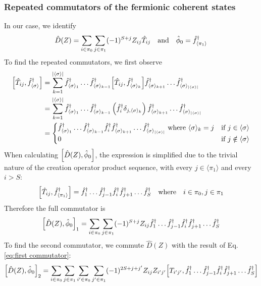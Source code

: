 \documentclass[12pt]{article}
\newcommand{\seq}[1]{\langle #1\rangle}
\newcommand{\hc}{^\dagger}
\begin{document}
	\subsubsection{Repeated commutators of the fermionic coherent states}
	In our case, we identify
	\begin{equation}
	\hat{D}(Z)=\sum_{i\in\pi_0}\sum_{j\in\pi_1}(-1)^{S+j}Z_{ij}\hat{T}_{ij}\qq{and}\hat{\phi}_0=\hat{f}\hc_{\seq{\pi_1}}
	\end{equation}
	To find the repeated commutators, we first observe
	\begin{align}
	\comm{\hat{T}_{ij}}{\hat{f}\hc_{\seq{\sigma}}}&=\sum_{k=1}^{\abs{\seq{\sigma}}}\hat{f}\hc_{\seq{\sigma}_1}\dots \hat{f}\hc_{\seq{\sigma}_{k-1}}\comm{\hat{T}_{ij}}{\hat{f}\hc_{\seq{\sigma}_k}}\hat{f}\hc_{\seq{\sigma}_{k+1}}\dots \hat{f}\hc_{\seq{\sigma}_\abs{\seq{\sigma}}}\nonumber\\
	&= \sum_{k=1}^{\abs{\seq{\sigma}}}\hat{f}\hc_{\seq{\sigma}_1}\dots \hat{f}\hc_{\seq{\sigma}_{k-1}}\left(\hat{f}\hc_{i}\delta_{j,\seq{\sigma}_k}\right)\hat{f}\hc_{\seq{\sigma}_{k+1}}\dots \hat{f}\hc_{\seq{\sigma}_\abs{\seq{\sigma}}}\nonumber\\
	&=\begin{cases}
		\hat{f}\hc_{\seq{\sigma}_1}\dots \hat{f}\hc_{\seq{\sigma}_{k-1}}\hat{f}\hc_{i}\hat{f}\hc_{\seq{\sigma}_{k+1}}\dots \hat{f}\hc_{\seq{\sigma}_\abs{\seq{\sigma}}} \text{ where } \seq{\sigma}_k=j & \text{if } j\in\seq{\sigma}\\
		0 & \text{if } j\notin\seq{\sigma}
	\end{cases}
	\end{align}
	When calculating $\comm{\hat{D}(Z)}{\hat{\phi}_0}$, the expression is simplified due to the trivial nature of the creation operator product sequence, with every $j\in\seq{\pi_1}$ and every $i>S$:
	\begin{equation}
	\comm{\hat{T}_{ij}}{\hat{f}\hc_{\seq{\pi_1}}}=\hat{f}\hc_1\dots \hat{f}\hc_{j-1}\hat{f}\hc_{i}\hat{f}\hc_{j+1}\dots \hat{f}\hc_{S}\qq{where}i\in\pi_0,j\in\pi_1
	\end{equation}
	Therefore the full commutator is
	\begin{equation}\label{eq:first commutator}
	\comm{\hat{D}(Z)}{\hat{\phi}_0}_1=\sum_{i\in\pi_0}\sum_{j\in\pi_1}(-1)^{S+j}Z_{ij}\hat{f}\hc_1\dots \hat{f}\hc_{j-1}\hat{f}\hc_{i}\hat{f}\hc_{j+1}\dots \hat{f}\hc_{S}
	\end{equation}
	To find the second commutator, we commute $\hat{D}(Z)$ with the result of Eq. \ref{eq:first commutator}:
	\begin{equation}
	\comm{\hat{D}(Z)}{\hat{\phi}_0}_2=\sum_{i\in\pi_0}\sum_{j\in\pi_1}\sum_{i'\in\pi_0}\sum_{j'\in\pi_1}(-1)^{2S+j+j'}Z_{ij}Z_{i'j'}\comm{T_{i'j'}}{\hat{f}\hc_1\dots \hat{f}\hc_{j-1}\hat{f}\hc_{i}\hat{f}\hc_{j+1}\dots \hat{f}\hc_{S}}
	\end{equation}
\end{document}
